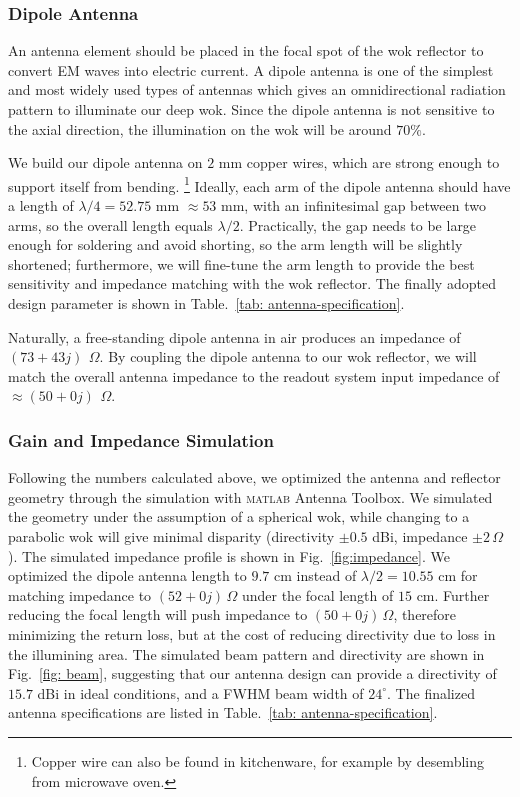 \documentclass[12pt]{article}
\begin{document}
   \subsubsection{Dipole Antenna}
    An antenna element should be placed in the focal spot of the wok reflector to convert EM waves into electric current. A dipole antenna is one of the simplest and most widely used types of antennas which gives an omnidirectional radiation pattern to illuminate our deep wok. Since the dipole antenna is not sensitive to the axial direction, the illumination on the wok will be around $70\%$. 

    We build our dipole antenna on $2$ mm copper wires, which are strong enough to support itself from bending. 
    \footnote{Copper wire can also be found in kitchenware, for example by desembling from microwave oven.} 
    Ideally, each arm of the dipole antenna should have a length of $\lambda/4 = 52.75$ mm $\approx 53$ mm, with an infinitesimal gap between two arms, so the overall length equals $\lambda/2$. Practically, the gap needs to be large enough for soldering and avoid shorting, so the arm length will be slightly shortened; furthermore, we will fine-tune the arm length to provide the best sensitivity and impedance matching with the wok reflector. 
    The finally adopted design parameter is shown in Table.~\ref{tab: antenna-specification}.
    
    Naturally, a free-standing dipole antenna in air produces an impedance of $(73+43j)\ \, \Omega$. By coupling the dipole antenna to our wok reflector, we will match the overall antenna impedance to the readout system input impedance of $\approx (50+0j)\ \, \Omega$.
    
    \subsubsection{Gain and Impedance Simulation} \label{sect: gain-simulation}
    Following the numbers calculated above, we optimized the antenna and reflector geometry through the simulation with \textsc{matlab} Antenna Toolbox. We simulated the geometry under the assumption of a spherical wok, while changing to a parabolic wok will give minimal disparity (directivity $\pm 0.5$ dBi, impedance $\pm 2 \, \Omega$). 
    The simulated impedance profile is shown in Fig.~\ref{fig:impedance}. We optimized the dipole antenna length to $9.7$ cm instead of $\lambda/2 = 10.55$ cm for matching impedance to $(52+0j)\, \Omega$ under the focal length of $15$ cm. 
    Further reducing the focal length will push impedance to $(50+0j)\, \Omega$, therefore minimizing the return loss, but at the cost of reducing directivity due to loss in the illumining area. 
    The simulated beam pattern and directivity are shown in Fig.~\ref{fig: beam}, suggesting that our antenna design can provide a directivity of $15.7$ dBi in ideal conditions, and a FWHM beam width of $24^\circ$. The finalized antenna specifications are listed in Table.~\ref{tab: antenna-specification}.
\end{document}
